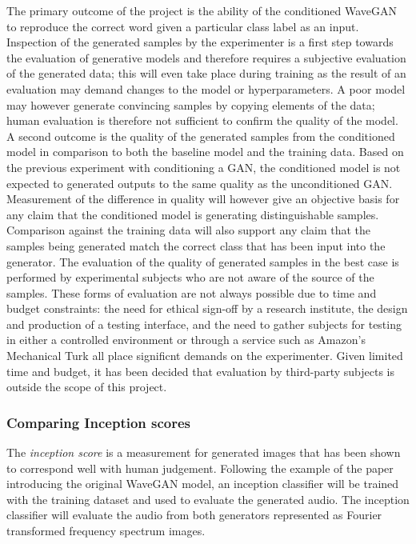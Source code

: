 \documentclass[a4paper, dvipsnames, titlepage]{article}
\begin{document}
The primary outcome of the project is the ability of the conditioned WaveGAN to reproduce the correct word given a particular class label as an input.
Inspection of the generated samples by the experimenter is a first step towards the evaluation of generative models and therefore requires a subjective evaluation of the generated data; this will even take place during training as the result of an evaluation may demand changes to the model or hyperparameters.
A poor model may however generate convincing samples by copying elements of the data; human evaluation is therefore not sufficient to confirm the quality of the model.
\newline
\newline
A second outcome is the quality of the generated samples from the conditioned model in comparison to both the baseline model and the training data.
Based on the previous experiment with conditioning a GAN, the conditioned model is not expected to generated outputs to the same quality as the unconditioned GAN.
Measurement of the difference in quality will however give an objective basis for any claim that the conditioned model is generating distinguishable samples.
Comparison against the training data will also support any claim that the samples being generated match the correct class that has been input into the generator.
\newline
\newline
The evaluation of the quality of generated samples in the best case is performed by experimental subjects who are not aware of the source of the samples.
These forms of evaluation are not always possible due to time and budget constraints: the need for ethical sign-off by a research institute, the design and production of a testing interface, and the need to gather subjects for testing in either a controlled environment or through a service such as Amazon's Mechanical Turk all place significnt demands on the experimenter.
Given limited time and budget, it has been decided that evaluation by third-party subjects is outside the scope of this project.

\subsubsection{Comparing Inception scores}

The \textit{inception score} is a measurement for generated images that has been shown to correspond well with human judgement.
Following the example of the paper introducing the original WaveGAN model, an inception classifier will be trained with the training dataset and used to evaluate the generated audio.
The inception classifier will evaluate the audio from both generators represented as Fourier transformed frequency spectrum images.
\end{document}
